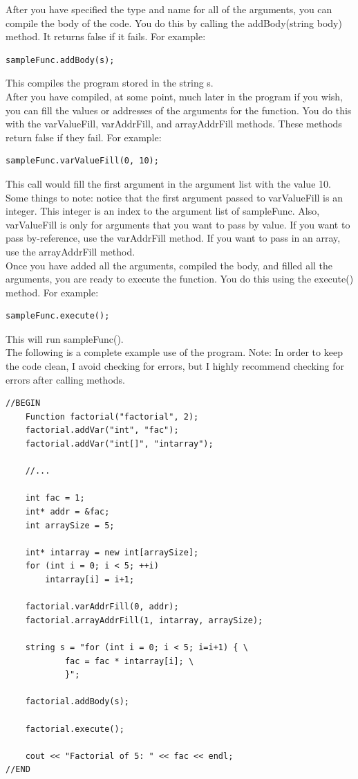 \documentclass{article}
\begin{document}
\noindent
After you have specified the type and name for all of the arguments, you can
compile the body of the code. You do this by calling the addBody(string body)
method. It returns false if it fails. For example:
{\ttfamily \begin{verbatim}
sampleFunc.addBody(s);
\end{verbatim} }
\noindent
This compiles the program stored in the string s. \\

\noindent
After you have compiled, at some point, much later in the program if you wish,
you can fill the values or addresses of the arguments for the function. You
do this with the varValueFill, varAddrFill, and arrayAddrFill methods. These
methods return false if they fail. For example:
{\ttfamily \begin{verbatim}
sampleFunc.varValueFill(0, 10);
\end{verbatim} }
\noindent
This call would fill the first argument in the argument list with the value
10. Some things to note: notice that the first argument passed to varValueFill
is an integer. This integer is an index to the argument list of sampleFunc.
Also, varValueFill is only for arguments that you want to pass by value. If 
you want to pass by-reference, use the varAddrFill method. If you want to pass
in an array, use the arrayAddrFill method. \\

\noindent
Once you have added all the arguments, compiled the body, and filled all the
arguments, you are ready to execute the function. You do this using the 
execute() method. For example:
{\ttfamily \begin{verbatim}
sampleFunc.execute();
\end{verbatim} }
\noindent
This will run sampleFunc(). \\

\noindent
The following is a complete example use of the program.
Note: In order to keep the code clean, I avoid checking for errors, but I
highly recommend checking for errors after calling methods.
{\ttfamily \begin{verbatim}
//BEGIN
	Function factorial("factorial", 2);
	factorial.addVar("int", "fac");
	factorial.addVar("int[]", "intarray");

	//...

	int fac = 1;
	int* addr = &fac;
	int arraySize = 5;

	int* intarray = new int[arraySize];
	for (int i = 0; i < 5; ++i)
	    intarray[i] = i+1;

	factorial.varAddrFill(0, addr);
	factorial.arrayAddrFill(1, intarray, arraySize);

	string s = "for (int i = 0; i < 5; i=i+1) { \
		 	fac = fac * intarray[i]; \
		    }"; 

	factorial.addBody(s);

	factorial.execute();

	cout << "Factorial of 5: " << fac << endl;
//END
\end{verbatim} }
\end{document}
